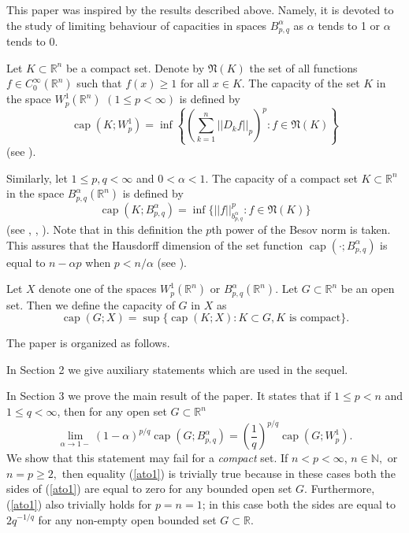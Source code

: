 \documentclass[12pt,twoside,reqno]{amsart}
\numberwithin{equation}{section}
\theoremstyle{definition}
\numberwithin{equation}{section}
\begin{document}
This paper was inspired by the results described above. Namely, it
is devoted to the   study of limiting behaviour of capacities in
spaces
 $B_{p,q}^{\alpha}$ as ${\alpha}$ tends to 1 or ${\alpha}$ tends to 0.

Let $K\subset {\mathbb{R}}^n$ be a compact set. Denote by $\mathfrak{N}(K)$ the
set of all functions $f\in C_0^\infty({\mathbb{R}}^n)$ such that  $f(x)\ge  1$ for all $x\in K.$
The capacity of the set $K$ in the space $W_p^1({\mathbb{R}}^n)\,\, (1\le
p<\infty)$ is defined by
\begin{equation}\label{sobolcap}
{\operatorname{cap}}(K;W_p^1)=\inf\left\{\left(\sum_{k=1}^n||D_k f||_p\right)^p: f\in \mathfrak{N}(K)\right\}
\end{equation}
(see \cite[2.2.1]{Maz2}).

Similarly, let $1\le p,q<\infty$ and $0<{\alpha}<1.$ The capacity of a
compact set $K\subset {\mathbb{R}}^n$ in the space $B_{p,q}^{\alpha}({\mathbb{R}}^n)$ is
defined by
\begin{equation}\label{besovcap}
{\operatorname{cap}}(K;B_{p,q}^{\alpha})=\inf\{||f||_{b_{p,q}^{\alpha}}^p: f\in \mathfrak{N}(K)\}
\end{equation}
(see \cite{Ad1}, \cite[Section 4]{AH}, \cite[Section 10.4]{Maz2}).
Note that in this definition the $p$th power of the Besov norm is
taken. This assures that the Hausdorff dimension of the set function
${\operatorname{cap}}(\cdot; B_{p,q}^{\alpha})$ is equal to $n-{\alpha} p$ when $p<n/{\alpha}$ (see
\cite{Ad1}).

Let $X$ denote one of the spaces $W_p^1({\mathbb{R}}^n)$ or
$B_{p,q}^{\alpha}({\mathbb{R}}^n).$ Let $G\subset {\mathbb{R}}^n$ be an open set. Then we
define the capacity of $G$ in $X$ as
$$
{\operatorname{cap}}(G;X)=\sup\{{\operatorname{cap}}(K;X): K\subset G, K \,\,\mbox{is compact}\}.
$$

The paper is organized as follows.

In Section 2 we give auxiliary statements which are used in the
sequel.

In Section 3 we prove the  main result of the paper. It states that
if $1\le p<n$ and $1\le q<\infty$, then for any open set $G\subset
{\mathbb{R}}^n$
\begin{equation}\label{ato1}
\lim_{{\alpha}\to 1-}(1-{\alpha})^{p/q} {\operatorname{cap}}\left(G; B_{p,q}^{\alpha}\right)=
\left(\frac1q\right)^{p/q}{\operatorname{cap}} (G; W_p^1).
\end{equation}
We show  that this statement may fail for a {\it compact} set. If
$n<p<\infty$, $n\in{\mathbb{N}},$ or $n=p\ge 2,$ then equality (\ref{ato1}) is
trivially true because in these cases both the sides of
(\ref{ato1}) are equal to zero for any bounded open set $G.$
Furthermore, (\ref{ato1}) also trivially holds for $p=n=1$; in this case both
the sides are equal to $2q^{-1/q}$ for any non-empty open bounded
set $G\subset {\mathbb{R}}.$
\end{document}
